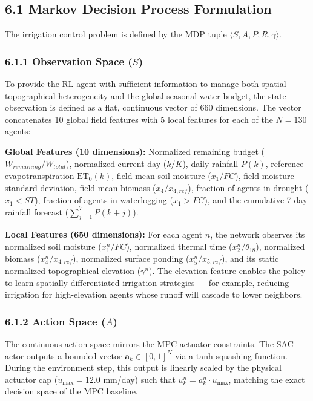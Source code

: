 \subsection{6.1 Markov Decision Process
Formulation}\label{markov-decision-process-formulation}

The irrigation control problem is defined by the MDP tuple
\(\langle S, A, P, R, \gamma \rangle\).

\subsubsection{\texorpdfstring{6.1.1 Observation Space
(\(S\))}{6.1.1 Observation Space (S)}}\label{observation-space-s}

To provide the RL agent with sufficient information to manage both
spatial topographical heterogeneity and the global seasonal water
budget, the state observation is defined as a flat, continuous vector of
660 dimensions. The vector concatenates 10 global field features with 5
local features for each of the \(N = 130\) agents:

\textbf{Global Features (10 dimensions):} Normalized remaining budget
(\(W_{remaining}/W_{total}\)), normalized current day (\(k/K\)), daily
rainfall \(P(k)\), reference evapotranspiration \(\text{ET}_0(k)\),
field-mean soil moisture (\(\bar{x}_1/FC\)), field-moisture standard
deviation, field-mean biomass (\(\bar{x}_4/x_{4,ref}\)), fraction of
agents in drought (\(x_1 < ST\)), fraction of agents in waterlogging
(\(x_1 > FC\)), and the cumulative 7-day rainfall forecast
(\(\sum_{j=1}^7 P(k+j)\)).

\textbf{Local Features (650 dimensions):} For each agent \(n\), the
network observes its normalized soil moisture (\(x_1^n/FC\)), normalized
thermal time (\(x_2^n/\theta_{18}\)), normalized biomass
(\(x_4^n/x_{4,ref}\)), normalized surface ponding (\(x_5^n/x_{5,ref}\)),
and its static normalized topographical elevation (\(\gamma^n\)). The
elevation feature enables the policy to learn spatially differentiated
irrigation strategies --- for example, reducing irrigation for
high-elevation agents whose runoff will cascade to lower neighbors.

\subsubsection{\texorpdfstring{6.1.2 Action Space
(\(A\))}{6.1.2 Action Space (A)}}\label{action-space-a}

The continuous action space mirrors the MPC actuator constraints. The
SAC actor outputs a bounded vector \(\mathbf{a}_k \in [0, 1]^N\) via a
tanh squashing function. During the environment step, this output is
linearly scaled by the physical actuator cap (\(u_{\max} = 12.0\)
mm/day) such that \(u_k^n = a_k^n \cdot u_{\max}\), matching the exact
decision space of the MPC baseline.

